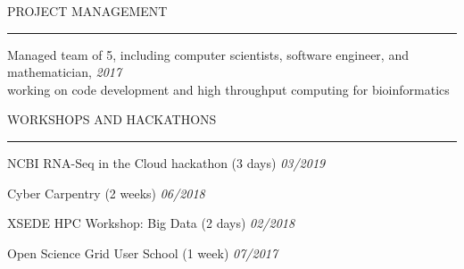 \documentclass{resume} %
\renewenvironment{rSection}[1]{
\sectionskip
\textcolor{RoyalPurple}{\MakeUppercase{#1}}
\sectionlineskip
\hrule
\begin{list}{}{
\setlength{\leftmargin}{1.5em}
}
\item[]
}{
\end{list}
}
\begin{document}

\begin{rSection}{Project Management}

\item Managed team of 5, including computer scientists, software engineer, and mathematician, \hfill {\em 2017}\\ 
working on code development and high throughput computing for bioinformatics

\end{rSection}


\begin{rSection}{Workshops and Hackathons}

\item NCBI RNA-Seq in the Cloud hackathon (3 days) \hfill {\em 03/2019}
\item Cyber Carpentry (2 weeks) \hfill {\em 06/2018}
\item XSEDE HPC Workshop: Big Data (2 days) \hfill {\em 02/2018}
\item Open Science Grid User School (1 week) \hfill {\em 07/2017}

\end{rSection}

\end{document}
